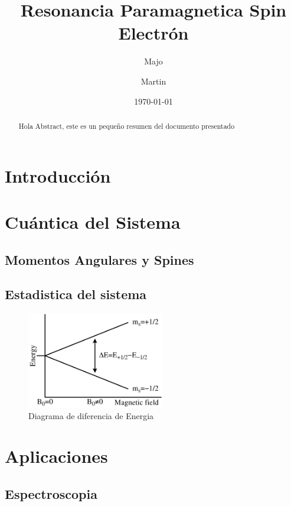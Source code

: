\documentclass[twocolumn,amssymb,prb,aps,superscriptaddress]{revtex4}
\begin{document}
\begin{abstract}
    Hola Abstract, este es un pequeño resumen del documento presentado
\end{abstract}

\title{Resonancia Paramagnetica Spin Electrón}
\author{Majo}


\author{Martin}


\date{\today}

\maketitle

\section[Intro]{Introducción}
\label{sec:intro}

\section[]{Cuántica del Sistema}
\label{sec:cuantica}

\subsection{Momentos Angulares y Spines}
\label{sec:momentosAngulares}

\subsection{Estadistica del sistema}
\label{mecanicaEstadistica}

    \begin{figure}[H]
        \centering
        \includegraphics*[width=6.0cm]{images/EPR_splitting}
        \caption{Diagrama de diferencia de Energia}
        \label{fig:diagramaDiferenciaDeEnergia} 
    \end{figure}

\section{Aplicaciones}
\label{sec:aplicacion1}

\subsection{Espectroscopia}
\label{sec:aplicacion2}
\end{document}
